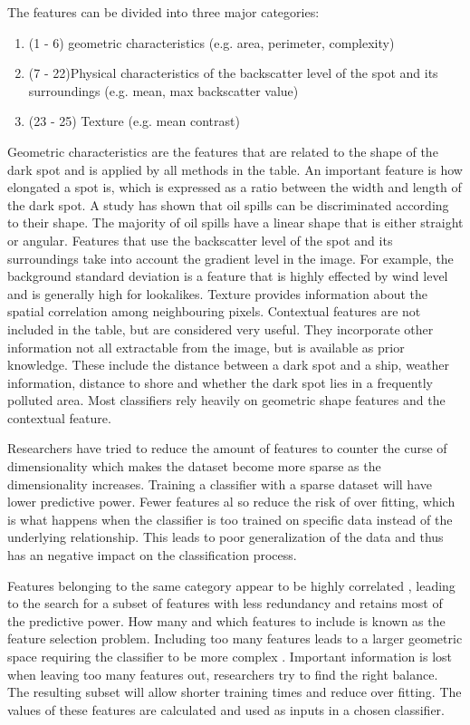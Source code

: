 The features can be divided into three major categories\cite{Brekke200595}:
\begin{enumerate}
\item (1 - 6) geometric characteristics (e.g. area, perimeter, complexity)
\item (7 - 22)Physical characteristics of the backscatter level of the spot and its surroundings (e.g. mean, max backscatter value)
\item (23 - 25) Texture (e.g. mean contrast)
\end{enumerate}

Geometric characteristics are the features that are related to the shape of the dark spot and is applied by all methods in the table\cite{Topouzelis200930}. An important feature is how elongated a spot is, which is expressed as a ratio between the width and length of the dark spot\cite{Gasull20071}. A study has shown that oil spills can be discriminated according to their shape\cite{Guo2014146}. The majority of oil spills have a linear shape that is either straight or angular\cite{Pavlakis200156}. Features that use the backscatter level of the spot and its surroundings take into account the gradient level in the image. For example, the background standard deviation is a feature that is highly effected by wind level and is generally high for lookalikes. Texture provides information about the spatial correlation among neighbouring pixels. Contextual features are not included in the table, but are considered very useful\cite{Topouzelis200930}. They incorporate other information not all extractable from the image, but is available as prior knowledge. These include the distance between a dark spot and a ship, weather information, distance to shore and whether the dark spot lies in a frequently polluted area. Most classifiers rely heavily on geometric shape features and the contextual feature.\cite{Xu201414}

Researchers have tried to reduce the amount of features to counter the curse of dimensionality which makes the dataset become more sparse as the dimensionality increases. Training a classifier with a sparse dataset will have lower predictive power. Fewer features al so reduce the risk of over fitting, which is what happens when the classifier is too trained on specific data instead of the underlying relationship. This leads to poor generalization of the data and thus has an negative impact on the classification process.

Features belonging to the same category appear to be highly correlated \cite{Xu201414}, leading to the search for a subset of features with less redundancy and retains most of the predictive power. How many and which features to include is known as the feature selection problem. Including too many features leads to a larger geometric space requiring the classifier to be more complex . Important information is lost when leaving too many features out, researchers try to find the right balance. The resulting subset will allow shorter training times and reduce over fitting. The values of these features are calculated and used as inputs in a chosen classifier.
